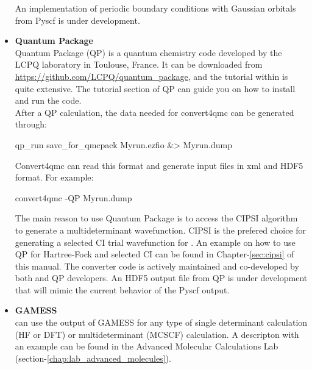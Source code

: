\begin{itemize}
\begin{itemize}
\end{itemize}

 An implementation of periodic boundary conditions with Gaussian orbitals from Pyscf is under development. 

\item \textbf{Quantum Package}\\
Quantum Package\cite{QP} (QP) is a quantum chemistry code developed by the LCPQ laboratory in Toulouse, France. It can be downloaded from \url{https://github.com/LCPQ/quantum_package}, and the tutorial within is quite extensive. The tutorial section of QP can guide you on how to install and run the code.\\
After a QP calculation, the data needed for convert4qmc can be generated through:\\
\begin{shade}
 qp_run save_for_qmcpack Myrun.ezfio &> Myrun.dump
\end{shade}

Convert4qmc can read this format and generate \qmcpack input files in xml and HDF5 format.  For example:

\begin{shade}
 convert4qmc -QP Myrun.dump
\end{shade}


The main reason to use Quantum Package is to access the CIPSI algorithm to generate a multideterminant wavefunction.
CIPSI is the prefered choice for generating a selected CI trial wavefunction for \qmcpack.
An example on how to use QP for Hartree-Fock and selected CI can be found in Chapter-\ref{sec:cipsi}  of this manual.
The converter code is actively maintained and co-developed by both \qmcpack and QP developers.
An HDF5 output file from QP is under development that will mimic the current behavior of the Pyscf output.  


\item \textbf{GAMESS}\\
\qmcpack can use the output of GAMESS\cite{schmidt93} for any type of single determinant calculation (HF or DFT) or multideterminant (MCSCF) calculation. A descripton with an example can be found in the Advanced Molecular Calculations Lab (section-\ref{chap:lab_advanced_molecules}).
\end{itemize}

